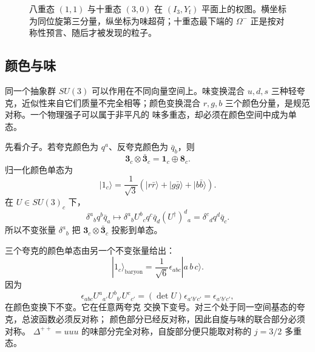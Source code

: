 \begin{figure}[htbp]
\centering

\caption{八重态 $(1,1)$ 与十重态 $(3,0)$ 在 $(I_3,Y_{\mathrm f})$ 平面上的权图。横坐标为同位旋第三分量，纵坐标为味超荷；十重态最下端的 $\Omega^-$ 正是按对称性预言、随后才被发现的粒子。}
\label{fig:su3-octet-decuplet}
\end{figure}

\subsection{颜色与味}

同一个抽象群 $SU(3)$ 可以作用在不同向量空间上。味变换混合
$u,d,s$ 三种轻夸克，近似性来自它们质量不完全相等；颜色变换混合
$r,g,b$ 三个颜色分量，是规范对称。一个物理强子可以属于非平凡的
味多重态，却必须在颜色空间中成为单态。

先看介子。若夸克颜色为 $q^a$、反夸克颜色为 $\bar q_b$，则
\[
\mathbf3_c\otimes\bar{\mathbf3}_c
=\mathbf1_c\oplus\mathbf8_c.
\]
归一化颜色单态为
\[
|1_c\rangle=\frac1{\sqrt3}
\left(|r\bar r\rangle+|g\bar g\rangle+|b\bar b\rangle\right).
\]
在 $U\in SU(3)_c$ 下，
\[
\delta^a{}_b q^b\bar q_a
\longmapsto
\delta^a{}_b U^b{}_c q^c
\bar q_d(U^\dagger)^d{}_a
=\delta^c{}_d q^d\bar q_c.
\]
所以不变张量 $\delta^a{}_b$ 把
$\mathbf3_c\otimes\bar{\mathbf3}_c$ 投影到单态。

三个夸克的颜色单态由另一个不变张量给出：
\begin{equation}
|1_c\rangle_{\mathrm{baryon}}
=\frac1{\sqrt6}\epsilon_{abc}|a\,b\,c\rangle.
\label{eq:baryon-color-singlet}
\end{equation}
因为
\[
\epsilon_{abc}U^a{}_{a'}U^b{}_{b'}U^c{}_{c'}
=(\det U)\epsilon_{a'b'c'}
=\epsilon_{a'b'c'},
\]
 在颜色变换下不变。它在任意两夸克
交换下变号。对三个处于同一空间基态的夸克，总波函数必须反对称；
颜色部分已经反对称，因此自旋与味的联合部分必须对称。
$\Delta^{++}=uuu$ 的味部分完全对称，自旋部分便只能取对称的
$j=3/2$ 多重态。

